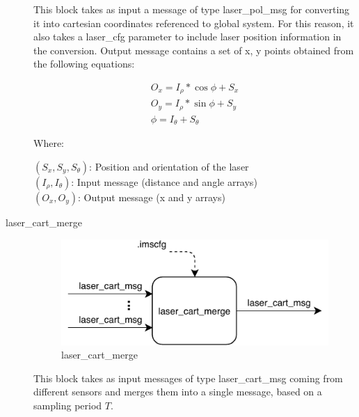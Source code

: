\begin{description}
This block takes as input a message of type laser\_pol\_msg for converting it into cartesian coordinates referenced to global system. For this reason, it also takes a laser\_cfg parameter to include laser position information in the conversion. Output message contains a set of x, y points obtained from the following equations:

\begin{eqnarray*}
O_x = I_\rho*\cos{\phi}+S_x \\
O_y = I_\rho*\sin{\phi} + S_y \\
\phi = I_\theta + S_\theta
\end{eqnarray*}

Where:

$(S_x, S_y, S_\theta)$: Position and orientation of the laser \\
$(I_\rho, I_\theta )$: Input message (distance and angle arrays) \\
$(O_x, O_y )$: Output message (x and y arrays) \\


\item[laser\_cart\_merge] \hfill

\begin{figure}[ht!]
\centering
\includegraphics[scale=1]{fig/3/laser_cart_merge.pdf}
\caption{laser\_cart\_merge}
\label{laser_cart_merge}
\end{figure}

This block takes as input messages of type laser\_cart\_msg coming from different sensors and merges them into a single message, based on a sampling period $T$.

%

\end{description}


